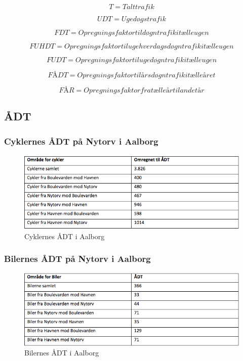 $$T = Talt trafik$$

$$UDT = Ugedøgstrafik$$

$$FDT = Opregningsfaktor til døgntrafik i tælleugen$$

$$FUHDT = Opregningsfaktor til ugehverdagsdøgntrafik i tælleugen$$

$$FUDT = Opregningsfaktor til ugedøgntrafik i tælleugen$$

$$FÅDT = Opregningsfaktor til årsdøgntrafik i tælleåret$$

$$FÅR = Opregningsfaktor fra tælleår til andet år$$


\subsection{ÅDT}
\label{AEDT}
\subsubsection{Cyklernes ÅDT på Nytorv i Aalborg}
\begin{figure}[htbp]
   \centering
   \begin{adjustbox}{max width=\textwidth}
     \includegraphics[scale=0.8]{figures/Billederogfigur/cykleradt.jpg}
  \end{adjustbox}
   \caption{Cyklernes ÅDT i Aalborg}
   \label{fig:cykleradt}
 \end{figure}

 \subsubsection{Bilernes ÅDT på Nytorv i Aalborg}
 \begin{figure}[htbp]
   \centering
   \begin{adjustbox}{max width=\textwidth}
     \includegraphics[scale=0.6]{figures/Billederogfigur/bileradt.jpg}
  \end{adjustbox}
   \caption{Bilernes ÅDT i Aalborg}
   \label{fig:bileradt}
 \end{figure}

